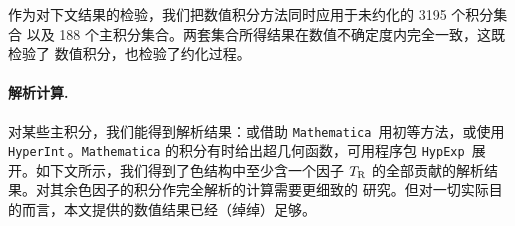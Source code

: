 作为对下文结果的检验，我们把数值积分方法同时应用于未约化的 3195 个积分集合
以及 188 个主积分集合。两套集合所得结果在数值不确定度内完全一致，这既检验了
数值积分，也检验了约化过程。

\paragraph{解析计算.}
对某些主积分，我们能得到解析结果：或借助
\texttt{Mathematica}\,\cite{Mathematica11.3} 用初等方法，或使用
\texttt{HyperInt}\,\cite{Panzer:2014caa}。\texttt{Mathematica}
的积分有时给出超几何函数，可用程序包 \texttt{HypExp}\,\cite{Huber:2005yg,
Huber:2007dx} 展开。如下文所示，我们得到了色结构中至少含一个因子
$T_\mathrm{R}$ 的全部贡献的解析结果。对其余色因子的积分作完全解析的计算需要更细致的
研究。但对一切实际目的而言，本文提供的数值结果已经（绰绰）足够。
